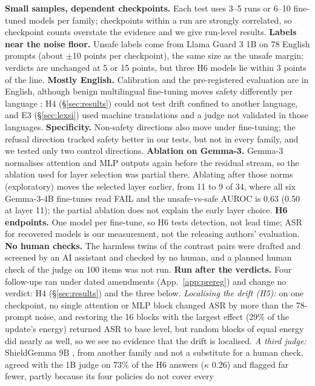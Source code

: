 \documentclass[11pt]{article}
\begin{document}
\textbf{Small samples, dependent checkpoints.} Each test uses 3--5 runs or 6--10 fine-tuned models per family; checkpoints within
a run are strongly correlated, so checkpoint counts overstate the evidence and we give run-level results.
\textbf{Labels near the noise floor.} Unsafe labels come from Llama Guard 3 1B on 78 English prompts (about $\pm$10
points per checkpoint), the same size as the unsafe margin; verdicts are unchanged at 5 or 15 points, but three H6 models
lie within 3 points of the line. \textbf{Mostly English.} Calibration and the pre-registered
evaluation are in English, although benign multilingual fine-tuning moves safety differently per language
\citep{hawkins2026multilingual}; H4 (\S\ref{sec:results}) could not test drift confined to another language, and E3 (\S\ref{sec:lexsi}) used machine
translations and a judge not validated in those languages. \textbf{Specificity.}
Non-safety directions also move under fine-tuning; the refusal direction tracked safety better in our tests, but not in
every family, and we tested only two control directions. \textbf{Ablation on Gemma-3.} Gemma-3 normalises attention and MLP outputs again before the residual stream, so the
ablation used for layer selection was partial there. Ablating after those norms (exploratory) moves the selected layer
earlier, from 11 to 9 of 34, where all six Gemma-3-4B fine-tunes read FAIL and the unsafe-vs-safe AUROC is 0.63
(0.50 at layer 11); the partial ablation does not explain the early layer choice. \textbf{H6 endpoints.} One model per fine-tune, so H6 tests
detection, not lead time; ASR for recovered models is our measurement, not the releasing authors' evaluation.
\textbf{No human checks.} The harmless twins of the contrast pairs were drafted and screened by an AI assistant and
checked by no human, and a planned human check of the judge on 100 items was not run. \textbf{Run after the
verdicts.} Four follow-ups ran under dated amendments (App.~\ref{app:prereg}) and change no verdict: H4
(\S\ref{sec:results}) and the three below. \emph{Localising the drift (H5):} on one
checkpoint, no single attention or MLP block changed ASR by more than the 78-prompt noise, and restoring the 16 blocks
with the largest effect (29\% of the update's energy) returned ASR to base level, but random blocks of equal energy
did nearly as well, so we see no evidence that the drift is localised. \emph{A third judge:} ShieldGemma 9B
\citep{zeng2024shieldgemma}, from another family and not a substitute for a human check, agreed with the 1B judge on
73\% of the H6 answers ($\kappa$ 0.26) and flagged far fewer, partly because its four policies do not cover every
\end{document}
